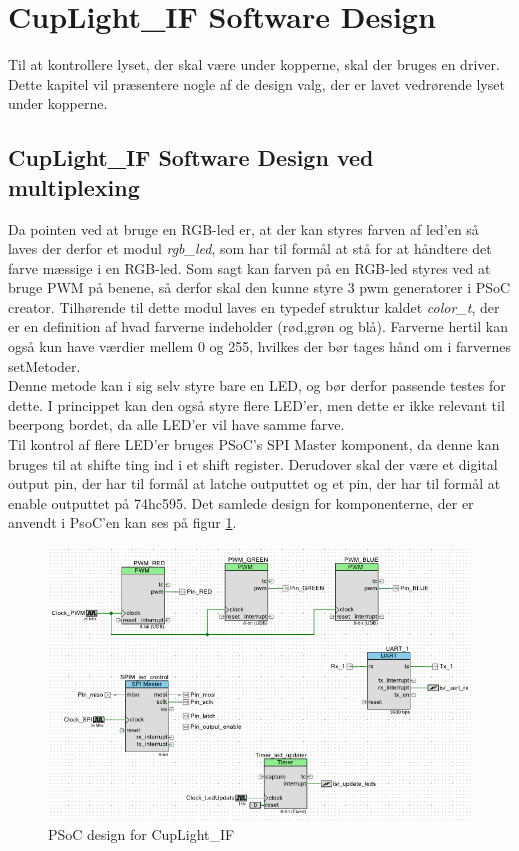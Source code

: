 \documentclass[Softwaredesign/Softwaredesign_main.tex]{subfiles}
\begin{document}
\section{CupLight\_IF Software Design}
Til at kontrollere lyset, der skal være under kopperne, skal der bruges en driver. Dette kapitel vil præsentere nogle af de design valg, der er lavet vedrørende lyset under kopperne.
\subsection{CupLight\_IF Software Design ved multiplexing}
Da pointen ved at bruge en RGB-led er, at der kan styres farven af led'en så laves der derfor et modul \textit{rgb\_led}, som har til formål at stå for at håndtere det farve mæssige i en RGB-led. Som sagt kan farven på en RGB-led styres ved at bruge PWM på benene, så derfor skal den kunne styre 3 pwm generatorer i PSoC creator. Tilhørende til dette modul laves en typedef struktur kaldet \textit{color\_t}, der er en definition af hvad farverne indeholder (rød,grøn og blå). Farverne hertil kan også kun have værdier mellem 0 og 255, hvilkes der bør tages hånd om i farvernes setMetoder.
\\Denne metode kan i sig selv styre bare en LED, og bør derfor passende testes for dette. I princippet kan den også styre flere LED'er, men dette er ikke relevant til beerpong bordet, da alle LED'er vil have samme farve.
\\Til kontrol af flere LED'er bruges PSoC's SPI Master komponent, da denne kan bruges til at shifte ting ind i et shift register. Derudover skal der være et digital output pin, der har til formål at latche outputtet og et pin, der har til formål at enable outputtet på 74hc595. Det samlede design for komponenterne, der er anvendt i PsoC'en kan ses på figur \ref{fig:CupLight_PSoC_Design}.
\begin{figure}[H]
    \centering
    \includegraphics[width=\textwidth]{Softwaredesign/CupLight_IF/graphics/CupLightPSoCDesign.png}
    \caption{PSoC design for CupLight\_IF}
    \label{fig:CupLight_PSoC_Design}
\end{figure}
\end{document}
